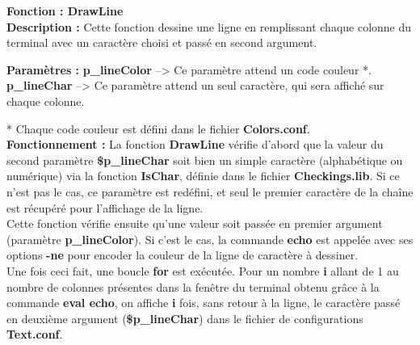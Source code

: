 \documentclass[a4paper,10pt]{article}
\begin{document}
\textbf{Fonction : \color{mauve}DrawLine\color{white}}\\[1\baselineskip]
\textbf{Description :}\linebreak
Cette fonction dessine une ligne en remplissant chaque colonne du terminal avec un caractère choisi et passé en second argument.\linebreak

\textbf{Paramètres :}\linebreak
\textbf{\color{orange}p\_lineColor\color{white}} --> Ce paramètre attend un code couleur *.\linebreak
\textbf{\color{orange}p\_lineChar\color{white}} --> Ce paramètre attend un seul caractère, qui sera affiché sur chaque colonne.\linebreak

* Chaque code couleur est défini dans le fichier \textbf{\color{lime}Colors.conf\color{white}}.\\[1\baselineskip]

\textbf{Fonctionnement :}\linebreak
La fonction \textbf{\color{mauve}DrawLine\color{white}} vérifie d'abord que la valeur du second paramètre \textbf{\color{orange}\$p\_lineChar\color{white}} soit bien un simple caractère (alphabétique ou numérique) via la fonction \textbf{\color{mauve}IsChar\color{white}}, définie dans le fichier \textbf{\color{lime}Checkings.lib\color{white}}. Si ce n'est pas le cas, ce paramètre est redéfini, et seul le premier caractère de la chaîne est récupéré pour l'affichage de la ligne.\\[1\baselineskip]

Cette fonction vérifie ensuite qu'une valeur soit passée en premier argument (paramètre \textbf{\color{orange}p\_lineColor\color{white}}). Si c'est le cas, la commande \textbf{\color{gray}echo\color{white}} est appelée avec ses options \textbf{\color{gray}-ne\color{white}} pour encoder la couleur de la ligne de caractère à dessiner.\\[1\baselineskip]

Une fois ceci fait, une boucle \textbf{for} est exécutée. Pour un nombre \textbf{i} allant de 1 au nombre de colonnes présentes dans la fenêtre du terminal obtenu grâce à la commande \textbf{\color{gray}eval echo\color{white}}, on affiche \textbf{i} fois, sans retour à la ligne, le caractère passé en deuxième argument (\textbf{\color{orange}\$p\_lineChar\color{white}}) dans le fichier de\linebreak
configurations \textbf{\color{lime}Text.conf\color{white}}.\\[1\baselineskip]
\end{document}
